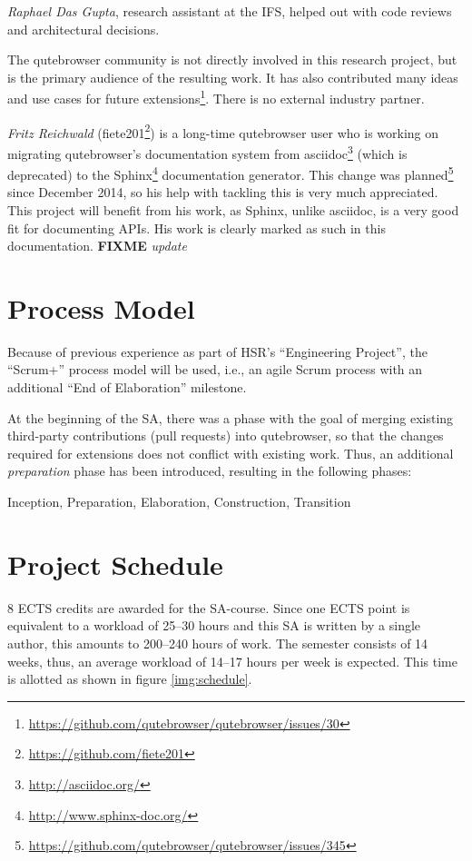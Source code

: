 \documentclass[a4paper,parskip=full,DIV=14,BCOR=15mm]{scrreprt}
\newcommand{\fixme}[1]{\textbf{FIXME} \emph{#1}}
\begin{document}
\emph{Raphael Das Gupta}, research assistant at the IFS, helped out with code
reviews and architectural decisions.

The qutebrowser community is not directly involved in this research project, but
is the primary audience of the resulting work. It has also contributed many
ideas and use cases for future
extensions\footnote{\url{https://github.com/qutebrowser/qutebrowser/issues/30}}.
There is no external industry partner.

\label{fiete}
\emph{Fritz Reichwald} (fiete201\footnote{\url{https://github.com/fiete201}})
is a long-time qutebrowser user who is working on migrating qutebrowser's
documentation system from asciidoc\footnote{\url{http://asciidoc.org/}} (which
is deprecated) to the Sphinx\footnote{\url{http://www.sphinx-doc.org/}}
documentation generator. This change was
planned\footnote{\url{https://github.com/qutebrowser/qutebrowser/issues/345}}
since December 2014, so his help with tackling this is very much appreciated.
This project will benefit from his work, as Sphinx, unlike asciidoc, is a
very good fit for documenting APIs. His work is clearly marked as such in this
documentation. \fixme{update}

\section{Process Model}
Because of previous experience as part of HSR's ``Engineering Project'', the
``Scrum+'' process model will be used, i.e., an agile Scrum process with an
additional ``End of Elaboration'' milestone.

At the beginning of the SA, there was a phase with the goal of merging existing
third-party contributions (pull requests) into qutebrowser, so that the changes
required for extensions does not conflict with existing work. Thus, an additional
\emph{preparation} phase has been introduced, resulting in the following phases:

Inception, Preparation, Elaboration, Construction, Transition

\section{Project Schedule}
\label{schedule}

8 ECTS credits are awarded for the SA-course. Since one ECTS point is equivalent
to a workload of 25--30 hours \autocite{ects} and this SA is written by a single
author, this amounts to 200--240 hours of work. The semester consists of 14
weeks, thus, an average workload of 14--17 hours per week is expected. This time
is allotted as shown in figure \ref{img:schedule}.
\end{document}
